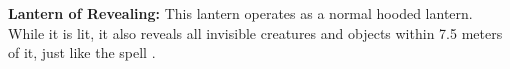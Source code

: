 





\textbf{Lantern of Revealing:} This lantern operates as a normal hooded lantern. While it is lit, it also reveals all invisible creatures and objects within 7.5 meters of it, just like the spell .

